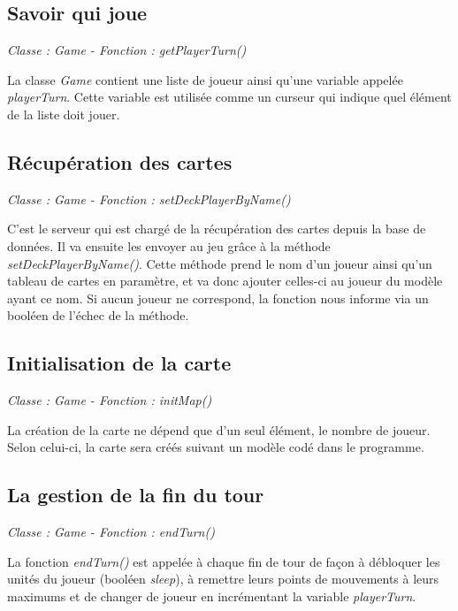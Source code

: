 \documentclass[a4paper, titlepage]{livret}
\begin{document}
      \subsection{Savoir qui joue}
        \begin{center}
        \textit{Classe : Game - Fonction : getPlayerTurn()}
        \end{center}
        La classe \textit{Game} contient une liste de joueur ainsi qu'une variable appelée \textit{playerTurn}. Cette variable est utilisée comme un curseur qui indique quel élément de la liste doit jouer.

      \subsection{Récupération des cartes}
        \begin{center}
        \textit{Classe : Game - Fonction : setDeckPlayerByName()}
        \end{center}
        C'est le serveur qui est chargé de la récupération des cartes depuis la base de données. Il va ensuite les envoyer au jeu grâce à la méthode \textit{setDeckPlayerByName()}. Cette méthode prend le nom d'un joueur ainsi qu'un tableau de cartes en paramètre, et va donc ajouter celles-ci au joueur du modèle ayant ce nom. Si aucun joueur ne correspond, la fonction nous informe via un booléen de l'échec de la méthode.
        
        \subsection{Initialisation de la carte}
        \begin{center}
        \textit{Classe : Game - Fonction : initMap()}
        \end{center}
        La création de la carte ne dépend que d'un seul élément, le nombre de joueur. Selon celui-ci, la carte sera créés suivant un modèle codé dans le programme.
        
        \subsection{La gestion de la fin du tour}
        \begin{center}
        \textit{Classe : Game - Fonction : endTurn()}
        \end{center}
        La fonction \textit{endTurn()} est appelée à chaque fin de tour de façon à débloquer les unités du joueur (booléen \textit{sleep}), à remettre leurs points de mouvements à leurs maximums et de changer de joueur en incrémentant la variable \textit{playerTurn}. 
        
\end{document}
